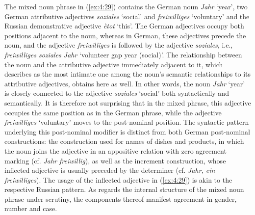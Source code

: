\noindent The mixed noun phrase in (\ref{ex:4:29}) contains the German noun \textit{Jahr} `year', two German attributive adjectives \textit{soziales} `social' and \textit{freiwilliges} `voluntary' and the Russian demonstrative adjective \textit{ètot} `this'. The German adjectives occupy both positions adjacent to the noun, whereas in German, these adjectives precede the noun, and the adjective \textit{freiwilliges} is followed by the adjective \textit{soziales}, i.e., \textit{freiwilliges soziales Jahr} `volunteer gap year (social)'. The relationship between the noun and the attributive adjective immediately adjacent to it, which \citet{seiler1976} describes as the most intimate one among the noun's semantic relationships to its attributive adjectives, obtains here as well. In other words, the noun \textit{Jahr} `year' is closely connected to the adjective \textit{soziales} `social' both syntactically and semantically. It is therefore not surprising that in the mixed phrase, this adjective occupies the same position as in the German phrase, while the adjective \textit{freiwilliges} `voluntary' moves to the post-nominal position. The syntactic pattern underlying this post-nominal modifier is distinct from both German post-nominal constructions: the construction used for names of dishes and products, in which the noun joins the adjective in an appositive relation with zero agreement marking (cf. \textit{Jahr freiwillig}), as well as the increment construction, whose inflected adjective is usually preceded by the determiner (cf. \textit{Jahr, ein freiwilliges}). The usage of the inflected adjective in (\ref{ex:4:29}) is akin to the respective Russian pattern. As regards the internal structure of the mixed noun phrase under scrutiny, the components thereof manifest agreement in gender, number and case.

